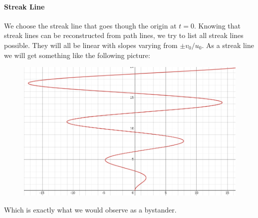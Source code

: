 \paragraph{Streak Line}
We choose the streak line that goes though the origin at $t=0$. Knowing that streak lines can be reconstructed from path lines, we try to list all streak lines possible. They will all be linear with slopes varying from $\pm v_0/u_0$. As a streak line we will get something like the following picture:
\begin{figure}[H]
	\centering
	\includegraphics[width=0.4\linewidth]{Sketches/SprinklerStreakLine}
	\label{fig:sprinklerstreakline}
\end{figure}
Which is exactly what we would observe as a bystander.






